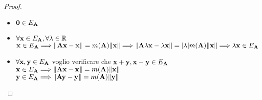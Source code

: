 \documentclass[10pt,a4paper]{article}
\begin{document}
\begin{proof}
\begin{itemize}
\item $\vb{0} \in E_{\vb{A}} $  
\item $\forall \vb{x} \in E_{\vb{A}}, \forall \lambda \in \mathbb{R}$ \\
$\vb{x} \in E_{\vb{A}} \Longrightarrow \norm{\vb{Ax-x}} = m(\vb{A})\norm{\vb{x}} \Longrightarrow \norm{\vb{A} \lambda \vb{x} -\lambda \vb{x}}= | \lambda | m(\vb{A}) \norm{\vb{x}}  \Longrightarrow \lambda \vb{x} \in E_{\vb{A}} $
\item $\forall \vb{x, y} \in E_{\vb{A}} $ voglio verificare che $\vb{x+y, x-y} \in E_{\vb{A}}$ \\
$\vb{x} \in E_{\vb{A}} \Longrightarrow \norm{\vb{Ax-x}} = m(\vb{A})\norm{\vb{x}}$ \\
$\vb{y} \in E_{\vb{A}} \Longrightarrow \norm{\vb{Ay-y}} = m(\vb{A})\norm{\vb{y}}$ 


\end{itemize}
\end{proof}
\end{document}
